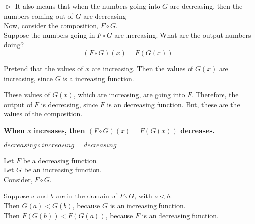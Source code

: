 \documentclass{ximera}
\begin{document}
$\vartriangleright$ It also means that when the numbers going into $G$ are decreasing, then the numbers coming out of $G$ are decreasing. \\



Now, consider the composition, $F \circ G$. \\


Suppose the numbers going in $F \circ G$ are increasing.  What are the output numbers doing? \\




\[ (F \circ G)(x) = F(G(x)) \]


Pretend that the values of $x$ are increasing. Then the values of $G(x)$ are increasing, since $G$ is a increasing function.

These values of $G(x)$, which are increasing, are going into $F$.  Therefore, the output of $F$ is decreasing, since $F$ is an decreasing function.  But, these are the values of the composition.


\begin{center}
\textbf{\textcolor{red!70!black}{When $x$ increases, then $(F \circ G)(x) = F(G(x))$ decreases.}}
\end{center}



\begin{fact}
$decreasing \circ increasing = decreasing$


Let $F$ be a decreasing function. \\
Let $G$ be an increasing function. \\


Consider, $F \circ G$.

Suppose $a$ and $b$ are in the domain of $F \circ G$, with $a < b$. \\

Then $G(a) < G(b)$, because $G$ is an increasing function. \\

Then $F(G(b)) < F(G(a))$, because $F$ is an decreasing function.


\end{fact}
\end{document}
